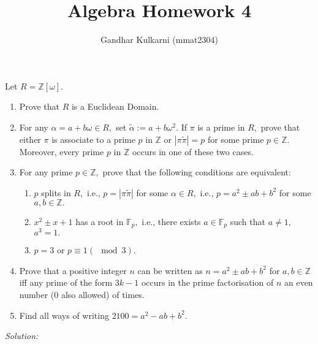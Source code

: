 \documentclass[]{article}
\title{Algebra Homework 4}
\author{Gandhar Kulkarni (mmat2304)}
\begin{document}
\maketitle

\section{}
Let $R=\mathbb{Z}[\omega]$.
\begin{enumerate}
	\item Prove that $R$ is a Euclidean Domain.
	\item For any $\alpha=a+b\omega \in R,$ set $\tilde{\alpha}:= a+b\omega^2.$ If $\pi$ is a prime in $R,$ prove that either $\pi$ is associate to a prime $p$ in $\mathbb{Z}$ or $|\pi \tilde{\pi}|=p$ for some prime $p \in \mathbb{Z}.$ Moreover, every prime $p$ in $\mathbb{Z}$ occurs in one of these two cases.
	\item For any prime $p \in \mathbb{Z},$ prove that the following conditions are equivalent: 
	\begin{enumerate}
		\item $p$ splits in $R,$ i.e., $p=|\pi \tilde{\pi}|$ for some $\alpha \in R,$ i.e., $p=a^2 \pm ab +b^2$ for some $a,b \in \mathbb{Z}.$
		\item $x^2\pm x +1$ has a root in $\mathbb{F}_p,$ i.e., there exists $a \in \mathbb{F}_p$ such that $a \neq 1,$ $a^3=1.$
		\item $p=3$ or $p \equiv  1 (\mod 3).$ 
	\end{enumerate}
	\item Prove that a positive integer $n$ can be written as $n=a^2 \pm ab +b^2$ for $a,b \in \mathbb{Z}$ iff any prime of the form $3k-1$ occurs in the prime factorisation of $n$ an even number ($0$ also allowed) of times.
	\item Find all ways of writing $2100=a^2-ab+b^2.$
\end{enumerate}
\emph{Solution:}
\end{document}
